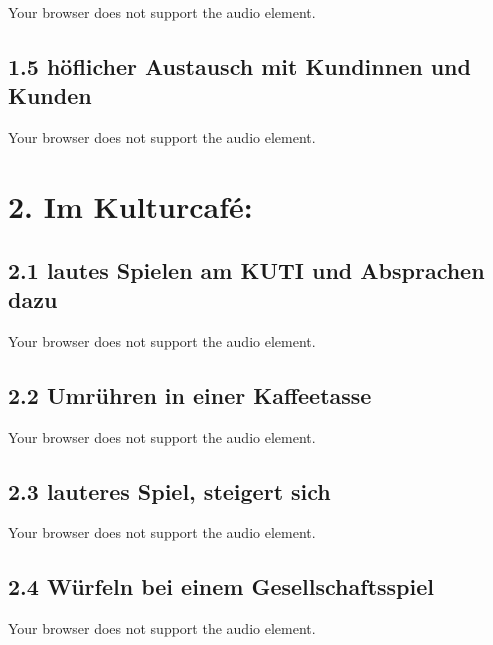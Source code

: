 \documentclass[a4paper,
fontsize=11pt,
oneside,
numbers=noperiodatend,
parskip=half-,
bibliography=totoc,
final
]{scrartcl}
\begin{document}
Your browser does not support the audio element.

\hypertarget{huxf6flicher-austausch-mit-kundinnen-und-kunden}{%
\subsection{1.5 höflicher Austausch mit Kundinnen und
Kunden}\label{huxf6flicher-austausch-mit-kundinnen-und-kunden}}

Your browser does not support the audio element.

\hypertarget{im-kulturcafuxe9}{%
\section{2. Im Kulturcafé:}\label{im-kulturcafuxe9}}

\hypertarget{lautes-spielen-am-kuti-und-absprachen-dazu}{%
\subsection{2.1 lautes Spielen am KUTI und Absprachen
dazu}\label{lautes-spielen-am-kuti-und-absprachen-dazu}}

Your browser does not support the audio element.

\hypertarget{umruxfchren-in-einer-kaffeetasse}{%
\subsection{2.2 Umrühren in einer
Kaffeetasse}\label{umruxfchren-in-einer-kaffeetasse}}

Your browser does not support the audio element.

\hypertarget{lauteres-spiel-steigert-sich}{%
\subsection{2.3 lauteres Spiel, steigert
sich}\label{lauteres-spiel-steigert-sich}}

Your browser does not support the audio element.

\hypertarget{wuxfcrfeln-bei-einem-gesellschaftsspiel}{%
\subsection{2.4 Würfeln bei einem
Gesellschaftsspiel}\label{wuxfcrfeln-bei-einem-gesellschaftsspiel}}

Your browser does not support the audio element.
\end{document}
